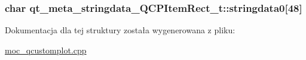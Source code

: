 \subsubsection[{\texorpdfstring{stringdata0}{stringdata0}}]{\setlength{\rightskip}{0pt plus 5cm}char qt\+\_\+meta\+\_\+stringdata\+\_\+\+Q\+C\+P\+Item\+Rect\+\_\+t\+::stringdata0\mbox{[}48\mbox{]}}\hypertarget{structqt__meta__stringdata___q_c_p_item_rect__t_a216a9c8bff154ce0d04ce8eb79a5d408}{}\label{structqt__meta__stringdata___q_c_p_item_rect__t_a216a9c8bff154ce0d04ce8eb79a5d408}


Dokumentacja dla tej struktury została wygenerowana z pliku\+:\begin{DoxyCompactItemize}
\item 
\hyperlink{moc__qcustomplot_8cpp}{moc\+\_\+qcustomplot.\+cpp}\end{DoxyCompactItemize}
